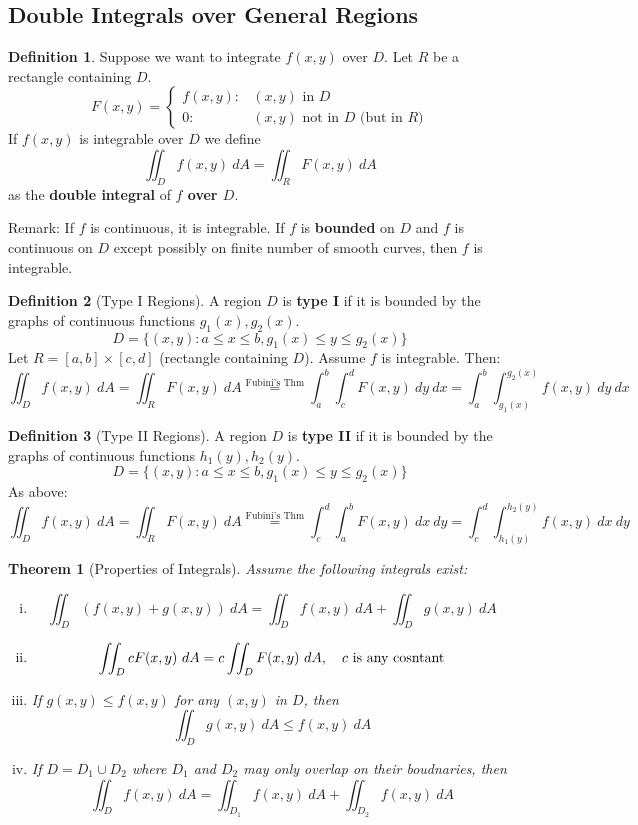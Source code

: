 \documentclass[12 pt]{article}
\newtheorem{thm}{Theorem}
\theoremstyle{definition}
\newtheorem{defn}{Definition}
\begin{document}
\subsection{Double Integrals over General Regions}
\begin{defn}
  Suppose we want to integrate $f(x,y)$ over $D$. Let $R$ be a rectangle containing $D$.
  $$ F(x,y)=
  \begin{cases}
    f(x,y): & (x,y) \text{ in }D
    \\0: & (x,y) \text{ not in $D$ (but in $R$)}
  \end{cases}$$
  If $f(x,y)$ is integrable over $D$ we define
  $$ \iint_{D}f(x,y) \ dA = \iint_{R}F(x,y)\ dA$$ as the \textbf{double integral} of \textbf{$f$ over $D$}.
\end{defn}
Remark: If $f$ is continuous, it is integrable. If $f$ is \textbf{bounded} on $D$ and $f$ is continuous on $D$ except possibly on finite number of smooth curves, then $f$ is integrable.
\begin{defn}[Type I Regions]
  A region $D$ is \textbf{type I} if it is bounded by the graphs of continuous functions $g_1(x),g_2(x)$.
  $$ D=\{(x,y): a\leq x \leq b, g_1(x)\leq y \leq g_2(x)\}$$
  Let $R=[a,b] \times [c,d]$ (rectangle containing $D$). Assume $f$ is integrable. Then: $$\iint_{D}f(x,y)\ dA = \iint_R F(x,y)\ dA \stackrel{\text{Fubini's Thm}}{=}\int_{a}^{b}\int_{c}^{d}F(x,y)\ dy \ dx = \int_{a}^{b}\int_{g_1(x)}^{g_2(x)}f(x,y)\ dy \ dx $$
\end{defn}
\begin{defn}[Type II Regions]
  A region $D$ is \textbf{type II} if it is bounded by the graphs of continuous functions $h_1(y),h_2(y)$.
  $$ D=\{(x,y): a\leq x \leq b, g_1(x)\leq y \leq g_2(x)\}$$
As above: $$\iint_{D}f(x,y)\ dA = \iint_R F(x,y)\ dA \stackrel{\text{Fubini's Thm}}{=}\int_{c}^{d}\int_{a}^{b}F(x,y)\ dx \ dy = \int_{c}^{d}\int_{h_1(y)}^{h_2(y)}f(x,y)\ dx \ dy $$
\end{defn}
\begin{thm}[Properties of Integrals]
  Assume the following integrals exist:
  \begin{enumerate}[i)]
  \item $$\iint_{D}(f(x,y)+g(x,y))\ dA = \iint_D f(x,y)\ dA + \iint_D g(x,y)\ dA$$
  \item $$ \iint_D cF(x,y)\ dA = c \iint_D F(x,y)\ dA, \hspace{10 pt} c \text{ is any cosntant}$$
  \item If $g(x,y)\leq f(x,y)$ for any $(x,y)$ in $D$, then
    $$ \iint_D g(x,y)\ dA \leq f(x,y)\ dA $$
  \item If $D=D_1 \cup D_2$ where $D_1$ and $D_2$ may only overlap on their boudnaries, then
    $$ \iint_D f(x,y)\ dA = \iint_{D_1}f(x,y)\ dA + \iint_{D_2}f(x,y)\ dA $$
  \end{enumerate}
\end{thm}
\end{document}
